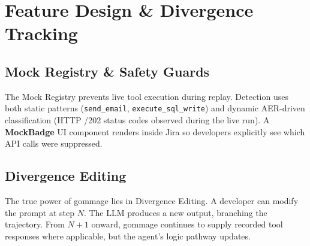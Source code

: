 \documentclass[11pt, a4paper]{article}
\begin{document}
\section{Feature Design \& Divergence Tracking}

\subsection{Mock Registry \& Safety Guards}
The Mock Registry prevents live tool execution during replay. Detection uses both static patterns (\texttt{send\_email}, \texttt{execute\_sql\_write}) and dynamic AER-driven classification (HTTP /202 \rmfamily status codes observed during the live run). A \textbf{MockBadge} UI component renders inside Jira so developers explicitly see which API calls were suppressed.

\subsection{Divergence Editing}
The true power of gommage lies in Divergence Editing. A developer can modify the prompt at step $N$. The LLM produces a new output, branching the trajectory. From $N+1$ onward, gommage continues to supply recorded tool responses where applicable, but the agent's logic pathway updates. 
\end{document}
